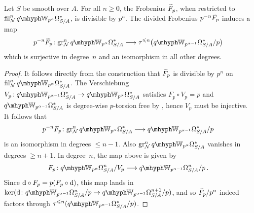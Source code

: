 \documentclass[DIV=12,numbers=enddot,leqno,bibliography=totoc]{scrartcl}
\begin{document}
	\begin{lem}\label{lem:NygaardFrobeniusTruncationSurjection}
		Let $S$ be smooth over $A$. For all $n\geqslant 0$, the Frobenius $\overtilde{F}_p$, when restricted to $ \fil_\Nn^n\qIW_{p^\alpha}\Omega_{S/A}^*$, is divisible by $p^n$. The divided Frobenius $p^{-n}\overtilde{F}_p$ induces a map
		\begin{equation*}
			p^{-n}\overtilde{F}_p\colon \gr_\Nn^n\qIW_{p^\alpha}\Omega_{S/A}^*\longrightarrow \tau^{\leqslant n}\bigl(\qIW_{p^{\alpha-1}}\Omega_{S/A}^*/p\bigr)
		\end{equation*}
		which is surjective in degree~$n$ and an isomorphism in all other degrees.
	\end{lem}
	\begin{proof}
		It follows directly from the construction that $\overtilde{F}_p$ is divisible by $p^n$ on $ \fil_\Nn^n\qIW_{p^\alpha}\Omega_{S/A}^*$. The Verschiebung $V_p\colon \qIW_{p^{\alpha-1}}\Omega_{S/A}^*\rightarrow \qIW_{p^{\alpha}}\Omega_{S/A}^*$ satisfies $F_p\circ V_p=p$ and $\qIW_{p^{\alpha-1}}\Omega_{S/A}^*$ is degree-wise $p$-torsion free by \cite[Proposition~]{qWitt}, hence $V_p$ must be injective. It follows that
		\begin{equation*}
			p^{-n}\overtilde{F}_p\colon \gr_\Nn^n\qIW_{p^\alpha}\Omega_{S/A}^*\longrightarrow \qIW_{p^{\alpha-1}}\Omega_{S/A}^*/p
		\end{equation*}
		is an isomorphism in degrees $\leqslant n-1$. Also $\gr_\Nn^n\qIW_{p^\alpha}\Omega_{S/A}^*$ vanishes in degrees $\geqslant n+1$. In degree~$n$, the map above is given by
		\begin{equation*}
			F_p\colon \qIW_{p^{\alpha}}\Omega_{S/A}^n/V_p\longrightarrow \qIW_{p^{\alpha-1}}\Omega_{S/A}^n/p\,.
		\end{equation*}
		Since $\mathop{}\!\mathrm{d}\circ F_p=p(F_p\circ \mathop{}\!\mathrm{d})$, this map lands in $\ker(\d\colon \qIW_{p^{\alpha-1}}\Omega_{S/A}^n/p\rightarrow \qIW_{p^{\alpha-1}}\Omega_{S/A}^{n+1}/p)$, and so $\overtilde{F}_p/p^n$ indeed factors through $\tau^{\leqslant n}(\qIW_{p^{\alpha-1}}\Omega_{S/A}^*/p)$.
		

\end{proof}
\end{document}
